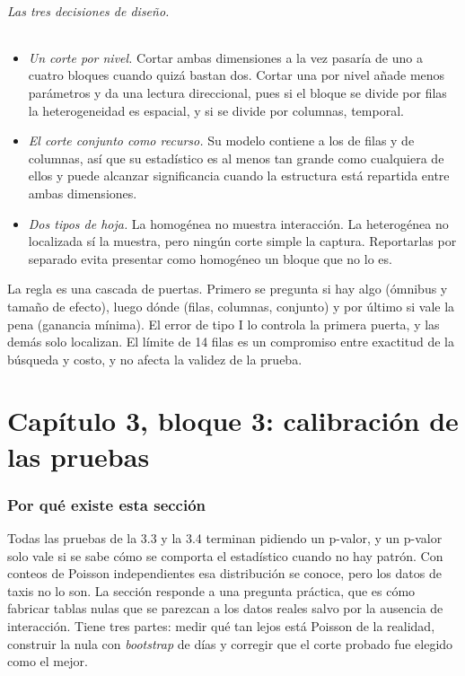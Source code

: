 \documentclass[11pt,a4paper]{article}
\newenvironment{idea}{\par\begin{center}\begin{lrbox}{\ideabox}\begin{minipage}{0.9\linewidth}}{\end{minipage}\end{lrbox}\fcolorbox{blue!40!black}{blue!5}{\usebox{\ideabox}}\end{center}}
\begin{document}
\paragraph{Las tres decisiones de diseño.}
\begin{itemize}
\item \emph{Un corte por nivel.} Cortar ambas dimensiones a la vez pasaría de uno a
cuatro bloques cuando quizá bastan dos. Cortar una por nivel añade menos parámetros
y da una lectura direccional, pues si el bloque se divide por filas la
heterogeneidad es espacial, y si se divide por columnas, temporal.
\item \emph{El corte conjunto como recurso.} Su modelo contiene a los de filas y de
columnas, así que su estadístico es al menos tan grande como cualquiera de ellos y
puede alcanzar significancia cuando la estructura está repartida entre ambas
dimensiones.
\item \emph{Dos tipos de hoja.} La homogénea no muestra interacción. La heterogénea
no localizada sí la muestra, pero ningún corte simple la captura. Reportarlas por
separado evita presentar como homogéneo un bloque que no lo es.
\end{itemize}

\begin{idea}
La regla es una cascada de puertas. Primero se pregunta si hay algo (ómnibus y
tamaño de efecto), luego dónde (filas, columnas, conjunto) y por último si vale la
pena (ganancia mínima). El error de tipo I lo controla la primera puerta, y las
demás solo localizan. El límite de 14 filas es un compromiso entre exactitud de la
búsqueda y costo, y no afecta la validez de la prueba.
\end{idea}

\part{Capítulo 3, bloque 3: calibración de las pruebas}

\section{Por qué existe esta sección}

Todas las pruebas de la 3.3 y la 3.4 terminan pidiendo un p-valor, y un p-valor solo
vale si se sabe cómo se comporta el estadístico cuando no hay patrón. Con conteos
de Poisson independientes esa distribución se conoce, pero los datos de taxis no lo
son. La sección responde a una pregunta práctica, que es cómo fabricar tablas nulas
que se parezcan a los datos reales salvo por la ausencia de interacción. Tiene tres
partes: medir qué tan lejos está Poisson de la realidad, construir la nula con
\emph{bootstrap} de días y corregir que el corte probado fue elegido como el mejor.
\end{document}
